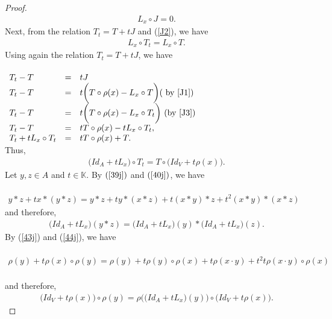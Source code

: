 \documentclass[12pt]{amsart}
\begin{document}
\begin{proof}
 \begin{eqnarray}
L_{x}\circ J=0.
\label{J2}
\end{eqnarray}
Next, from the relation $ T_{t}=T+tJ $ and  (\ref{J2}), we have \begin{eqnarray}
L_{x}\circ T_{t}=L_{x}\circ T.
\label{J3}
\end{eqnarray}
Using again the relation $ T_{t}=T+tJ $, we have\\\\
$ \begin{array}{lll}
T_{t}-T&=&tJ\\
T_{t}-T&=&t\bigg(T\circ\rho(x)-L_{x}\circ T\bigg)\text{( by \ref{J1})}\\
T_{t}-T&=&t\bigg(T\circ\rho(x)-L_{x}\circ T_{t}\bigg)\text{ (by \ref{J3})}\\
T_{t}-T&=&tT\circ\rho(x)-tL_{x}\circ T_{t},\\
T_{t}+tL_{x}\circ T_{t}&=&tT\circ\rho(x)+T.
\end{array} $\\
Thus, \begin{eqnarray}
\bigg(Id_{A}+tL_{x}\bigg)\circ T_{t}=T\circ \bigg(Id_{V}+t\rho(x)\bigg).
\label{J4}
\end{eqnarray}
Let $y,z\in A$ and $ t\in\mathbb{K}.$ By $ (\ref{39j}) $ and $  (\ref{40j}) $, we have \\\\
$ \begin{array}{lll}
y\ast z+tx\ast (y\ast z)=y\ast z+ty\ast(x\ast z)+t(x\ast y)\ast z+t^{2}(x\ast y)\ast(x\ast z)
\end{array} $\\
and therefore, \begin{eqnarray}
\bigg(Id_{A}+tL_{x}\bigg)(y\ast z)=\bigg(Id_{A}+tL_{x}\bigg)(y)\ast \bigg(Id_{A}+tL_{x}\bigg)(z).
\label{J5}
\end{eqnarray}
By (\ref{43j}) and (\ref{44j}), we have\\\\
$ \begin{array}{lll}
\rho(y)+t\rho(x)\circ\rho(y)=\rho(y)+t\rho(y)\circ\rho(x)+t\rho(x\cdot y)+t^{2}t\rho(x\cdot y)\circ\rho(x)
\end{array} $\\
\\
 and therefore, \begin{eqnarray}
 \bigg(Id_{V}+t\rho(x)\bigg)\circ \rho(y)=\rho\bigg(\bigg(Id_{A}+tL_{x}\bigg)(y)\bigg)\circ \bigg(Id_{V}+t\rho(x)\bigg).
 \label{J6}
 \end{eqnarray}

\end{proof}
\end{document}
